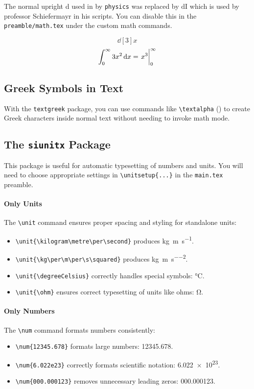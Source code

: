         The normal upright d used in by \texttt{physics} was replaced by $\mathrm{d\!I}$ which is used by professor Schiefermayr in his scripts. You can disable this in the \texttt{preamble/math.tex} under the custom math commands.

         \[ \dd[3]{x} \]
         \[ \int_{0}^{\infty} 3x^2 \dd{x} = \eval{x^3}_{0}^{\infty} \]

\subsection{Greek Symbols in Text}

    With the \verb|textgreek| package, you can use commands like \verb|\textalpha| (\textalpha) to create Greek characters inside normal text without needing to invoke math mode.

\subsection{The \texttt{siunitx} Package}

    This package is useful for automatic typesetting of numbers and units. You will need to choose appropriate settings in \verb|\unitsetup{...}| in the \verb|main.tex| preamble. %

    \paragraph*{Only Units}
        The \verb|\unit| command ensures proper spacing and styling for standalone units:
        \begin{itemize}
            \item \verb|\unit{\kilogram\metre\per\second}| produces \unit{\kilogram\metre\per\second}.
            \item \verb|\unit{\kg\per\m\per\s\squared}| produces \unit{\kg\per\m\per\s\squared}.
            \item \verb|\unit{\degreeCelsius}| correctly handles special symbols: \unit{\degreeCelsius}.
            \item \verb|\unit{\ohm}| ensures correct typesetting of units like ohms: \unit{\ohm}.
        \end{itemize}

    \paragraph*{Only Numbers}
        The \verb|\num| command formats numbers consistently:
        \begin{itemize}
            \item \verb|\num{12345.678}| formats large numbers: \num{12345.678}.
            \item \verb|\num{6.022e23}| correctly formats scientific notation: \num{6.022e23}.
            \item \verb|\num{000.000123}| removes unnecessary leading zeros: \num{000.000123}.
        \end{itemize}

